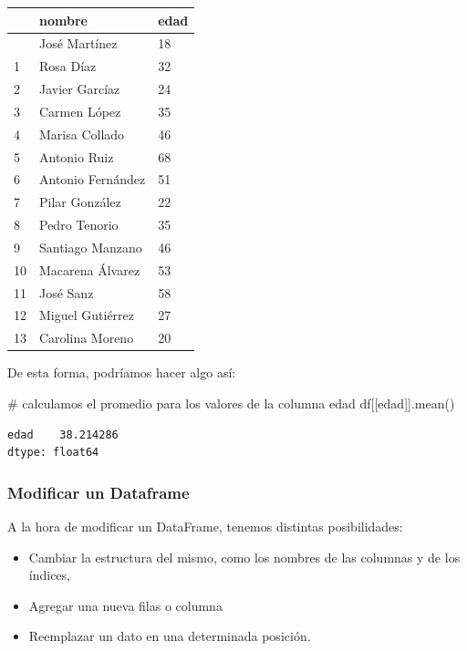\documentclass[
  letterpaper,
  DIV=11,
  numbers=noendperiod]{scrreprt}
\newenvironment{Shaded}{\begin{snugshade}}{\end{snugshade}}
\newcommand{\CommentTok}[1]{\textcolor[rgb]{0.37,0.37,0.37}{#1}}
\newcommand{\NormalTok}[1]{\textcolor[rgb]{0.00,0.23,0.31}{#1}}
\newcommand{\StringTok}[1]{\textcolor[rgb]{0.13,0.47,0.30}{#1}}
\providecommand{\tightlist}{%
  \setlength{\itemsep}{0pt}\setlength{\parskip}{0pt}}\usepackage{longtable,booktabs,array}
\begin{document}
\begin{longtable}[]{@{}lll@{}}
\toprule\noalign{}
& nombre & edad \\
\midrule\noalign{}
\endhead
\bottomrule\noalign{}
\endlastfoot
0 & José Martínez & 18 \\
1 & Rosa Díaz & 32 \\
2 & Javier Garcíaz & 24 \\
3 & Carmen López & 35 \\
4 & Marisa Collado & 46 \\
5 & Antonio Ruiz & 68 \\
6 & Antonio Fernández & 51 \\
7 & Pilar González & 22 \\
8 & Pedro Tenorio & 35 \\
9 & Santiago Manzano & 46 \\
10 & Macarena Álvarez & 53 \\
11 & José Sanz & 58 \\
12 & Miguel Gutiérrez & 27 \\
13 & Carolina Moreno & 20 \\
\end{longtable}

De esta forma, podríamos hacer algo así:

\begin{Shaded}
\begin{Highlighting}[]
\CommentTok{\# calculamos el promedio para los valores de la columna \textquotesingle{}edad\textquotesingle{}}
\NormalTok{df[[}\StringTok{\textquotesingle{}edad\textquotesingle{}}\NormalTok{]].mean()}
\end{Highlighting}
\end{Shaded}

\begin{verbatim}
edad    38.214286
dtype: float64
\end{verbatim}

\subsubsection{Modificar un Dataframe}\label{modificar-un-dataframe}

A la hora de modificar un DataFrame, tenemos distintas posibilidades:\\

\begin{itemize}
\tightlist
\item
  Cambiar la estructura del mismo, como los nombres de las columnas y de
  los índices,
\item
  Agregar una nueva filas o columna
\item
  Reemplazar un dato en una determinada posición.
\end{itemize}
\end{document}
